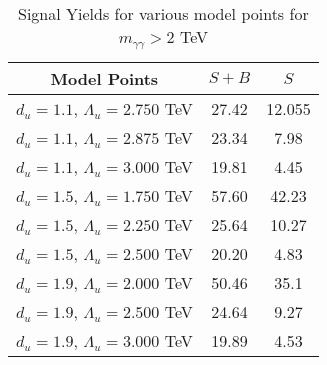 \documentclass[border=3mm,preview]{standalone}
\begin{document}
\begin{table}
  \caption{Signal Yields for various model points for $m_{\gamma\gamma} > 2$ TeV}
  \centering 
  \begin{threeparttable}
    \begin{tabular}{ccc}
    Model Points  &  $S+B$ & $S$ \\
     \midrule\midrule
     $d_{u} = 1.1$, $\Lambda_{u} = 2.750$ TeV &  27.42  & 12.055\\%
	$d_{u} = 1.1$, $\Lambda_{u} = 2.875$ TeV &  23.34  & 7.98\\%
    $d_{u} = 1.1$, $\Lambda_{u} = 3.000$ TeV &    19.81 & 4.45 \\ 
    $d_{u} = 1.5$, $\Lambda_{u} = 1.750$ TeV  & 57.60 & 42.23 \\ 
	$d_{u} = 1.5$, $\Lambda_{u} = 2.250$ TeV &  25.64 & 10.27 \\
	$d_{u} = 1.5$, $\Lambda_{u} = 2.500$ TeV &  20.20 & 4.83\\
    	$d_{u} = 1.9$, $\Lambda_{u} = 2.000$ TeV & 50.46 & 35.1\\
    	$d_{u} = 1.9$, $\Lambda_{u} = 2.500$ TeV &  24.64 & 9.27\\
    	$d_{u} = 1.9$, $\Lambda_{u} = 3.000$ TeV &  19.89 & 4.53\\
    \midrule\midrule
    \end{tabular}
\end{threeparttable}
  \end{table}
\end{document}
